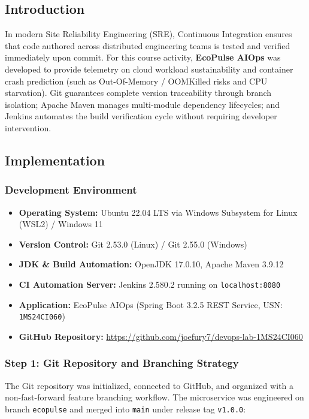 \documentclass[12pt,a4paper]{article}
\begin{document}
\subsection*{Introduction}
In modern Site Reliability Engineering (SRE), Continuous Integration ensures that code authored across distributed engineering teams is tested and verified immediately upon commit. For this course activity, \textbf{EcoPulse AIOps} was developed to provide telemetry on cloud workload sustainability and container crash prediction (such as Out-Of-Memory / OOMKilled risks and CPU starvation). Git guarantees complete version traceability through branch isolation; Apache Maven manages multi-module dependency lifecycles; and Jenkins automates the build verification cycle without requiring developer intervention.

\subsection*{Implementation}

\subsubsection*{Development Environment}
\begin{itemize}[nosep]
    \item \textbf{Operating System:} Ubuntu 22.04 LTS via Windows Subsystem for Linux (WSL2) / Windows 11
    \item \textbf{Version Control:} Git 2.53.0 (Linux) / Git 2.55.0 (Windows)
    \item \textbf{JDK \& Build Automation:} OpenJDK 17.0.10, Apache Maven 3.9.12
    \item \textbf{CI Automation Server:} Jenkins 2.580.2 running on \texttt{localhost:8080}
    \item \textbf{Application:} EcoPulse AIOps (Spring Boot 3.2.5 REST Service, USN: \texttt{1MS24CI060})
    \item \textbf{GitHub Repository:} \url{https://github.com/joefury7/devops-lab-1MS24CI060}
\end{itemize}

\subsubsection*{Step 1: Git Repository and Branching Strategy}
The Git repository was initialized, connected to GitHub, and organized with a non-fast-forward feature branching workflow. The microservice was engineered on branch \texttt{ecopulse} and merged into \texttt{main} under release tag \texttt{v1.0.0}:
\end{document}
